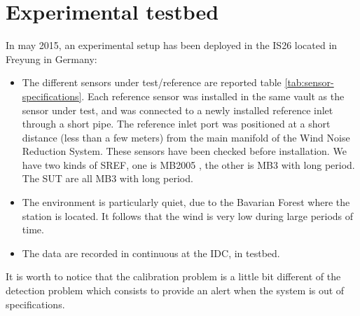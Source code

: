  \newpage\clearpage
\section{Experimental testbed}
In may 2015, an experimental setup has been deployed in the IS26 located in Freyung in Germany:
\begin{itemize}
\item
The different sensors under test/reference are reported table \ref{tab:sensor-specifications}. Each reference sensor was installed in the same vault as the sensor under test, and was connected to a newly installed reference inlet through a short pipe. The reference inlet port was positioned at a short distance (less than a few meters) from the main manifold of the Wind Noise Reduction System. 
These sensors have been checked before installation. We have two kinds of SREF, one is MB2005 , the other is MB3 with long period. The SUT are all MB3 with long period.
\item
The environment is particularly  quiet, due to the Bavarian Forest where the station is located. It follows that the wind is very low during large periods of time.

 \item
The data are recorded in continuous at the IDC, in testbed.
\end{itemize}

It is worth to notice that the calibration problem is a little bit different of the detection problem which consists to provide an alert when the system is out of specifications.


